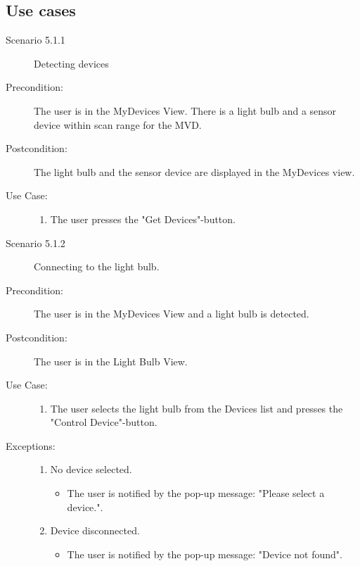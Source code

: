 \documentclass[a4paper]{article}
\begin{document}
\subsection{Use cases}
\begin{description}
\item[Scenario 5.1.1] Detecting devices
\item[Precondition:] The user is in the MyDevices View. There is a light bulb and a sensor device within scan range for the MVD.
\item[Postcondition:] The light bulb and the sensor device are displayed in the MyDevices view.
\item[Use Case:]\mbox{}
\begin{enumerate}
\item \label{1} The user presses the "Get Devices"-button.
\end{enumerate}

\item[]

\item[Scenario 5.1.2] Connecting to the light bulb.
\item[Precondition:] The user is in the MyDevices View and a light bulb is detected.
\item[Postcondition:] The user is in the Light Bulb View.
\item[Use Case:]\mbox{}
\begin{enumerate}
\item \label{1_bulb} The user selects the light bulb from the Devices list and presses the "Control Device"-button.
\end{enumerate}

\item[Exceptions:] 
\item[]
\begin{enumerate}
\item No device selected.
\begin{itemize}
\item The user is notified by the pop-up message: "Please select a device.".
\end{itemize}
\item Device disconnected.
\begin{itemize}
\item The user is notified by the pop-up message: "Device not found".
\end{itemize}

\end{enumerate}



\end{description}
\end{document}

